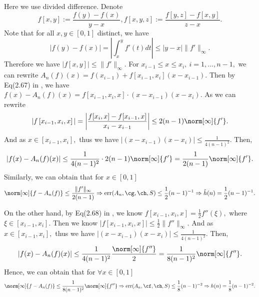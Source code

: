 Here we use divided difference. Denote
$$f[x,y]:=\frac{f(y)-f(x)}{y-x},f[x,y,z]:=\frac{f[y,z]-f[x,y]}{z-x}.$$
Note that for all $x,y \in [0,1]$ distinct, we have
 $$|f(y)-f(x)|=\left|\int_{x}^{y}f'(t)dt\right| \leq |y-x|\|f'\|_{\infty}.$$
 Therefore we have $|f[x,y]|\leq \|f'\|_{\infty}.$ 
For $x_{i-1} \leq x \leq x_i, \ i=1, \ldots, n-1,$ we  can rewrite
$A_{n}(f)(x)=f\left(x_{i-1}\right)+f\left[x_{i-1},x_{i}\right]\left(x-x_{i-1}\right).$
Then by Eq(2.67) in \cite{walter}, we have
$
f(x)-A_{n}(f)(x)
=f\left[x_{i-1},x_{i},x\right]\cdot (x-x_{i-1})(x-x_i).
$
As we can rewrite
$$|f\left[x_{i-1},x_{i},x\right]|=\left|\frac{f[x_{i},x]-f[x_{i-1},x]}{x_i-x_{i-1}}\right|\leq2(n-1)\norm[\infty]{f'}.$$
And as $x \in \left[x_{i-1},x_{i} \right],$ thus we have
$\left|(x-x_{i-1})(x-x_{i})\right| \leq \frac{1}{4(n-1)^2}.$
Then,
$$
|f(x)-A_{n}(f)(x)|\leq \frac{1}{4(n-1)^2}\cdot 2(n-1)\norm[\infty]{f'}=\frac{1}{2(n-1)}\norm[\infty]{f'}.
$$
Similarly, we can obtain that for $x \in [0,1]$
$$\norm[\infty]{f-A_{n}(f)} \leq \frac{\|f'\|_{\infty}}{2(n-1)} \Rightarrow \err(A_n,\cg,\ch,S) \leq \frac{1}{2}(n-1)^{-1} \Rightarrow \tilde{h}(n)=\frac{1}{2}(n-1)^{-1}.$$

On the other hand, by Eq(2.68) in \cite{walter},
we know
$f\left[x_{i-1},x_{i},x\right]=\frac{1}{2}f''(\xi),$ where $\xi \in [x_{i-1},x_{i}].$
Then we know
$
|f\left[x_{i-1},x_{i},x\right] |\leq \frac{1}{2}\|f''\|_{\infty}.$
And as $x \in \left[x_{i-1},x_{i} \right],$ thus we have
$\left|(x-x_{i-1})(x-x_{i})\right| \leq \frac{1}{4(n-1)^2}.$
Then,
$$
|f(x)-A_{n}(f)(x)|\leq \frac{1}{4(n-1)^2}\frac{\norm[\infty]{f''}}{2}=\frac{1}{8(n-1)^2}\norm[\infty]{f''}.
$$
Hence, we can obtain that for $\forall x \in [0,1]$
$$\norm[\infty]{f-A_{n}(f)} \leq  \frac{1}{8(n-1)^{2}}\norm[\infty]{f''} \Rightarrow \err(A_n,\cf,\ch,S) \leq \frac{1}{8}(n-1)^{-2}
\Rightarrow h(n)=\frac{1}{8}(n-1)^{-2}.$$



